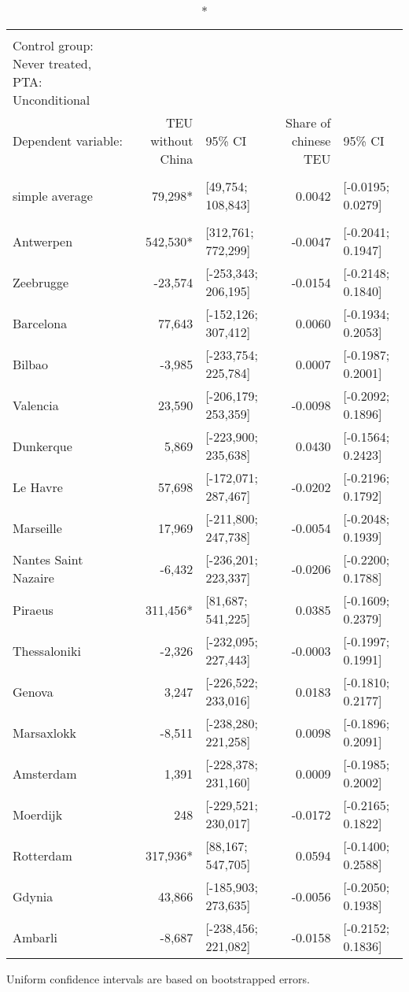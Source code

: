 \setlength{\LTpost}{0mm}
\begin{longtable}{l|rlrl}
\caption*{
{\large Aggregated average treatment effects on container throughput from different origins} \\ 
{\small Control group: Never treated, PTA: Unconditional}
} \\ 
\toprule
\multicolumn{1}{l}{Dependent variable:} & TEU without China & 95\% CI & Share of chinese TEU & 95\% CI \\ 
\midrule\addlinespace[2.5pt]
\multicolumn{5}{l}{\vspace*{-5mm}} \\ 
\midrule\addlinespace[2.5pt]
simple average &  79,298* & [49,754; 108,843] &  0.0042 & [-0.0195; 0.0279] \\ 
\midrule\addlinespace[2.5pt]
\multicolumn{5}{l}{by group:} \\ 
\midrule\addlinespace[2.5pt]
Antwerpen & 542,530* & [312,761; 772,299] & -0.0047 & [-0.2041; 0.1947] \\ 
Zeebrugge & -23,574 & [-253,343; 206,195] & -0.0154 & [-0.2148; 0.1840] \\ 
Barcelona &  77,643 & [-152,126; 307,412] &  0.0060 & [-0.1934; 0.2053] \\ 
Bilbao &  -3,985 & [-233,754; 225,784] &  0.0007 & [-0.1987; 0.2001] \\ 
Valencia &  23,590 & [-206,179; 253,359] & -0.0098 & [-0.2092; 0.1896] \\ 
Dunkerque &   5,869 & [-223,900; 235,638] &  0.0430 & [-0.1564; 0.2423] \\ 
Le Havre &  57,698 & [-172,071; 287,467] & -0.0202 & [-0.2196; 0.1792] \\ 
Marseille &  17,969 & [-211,800; 247,738] & -0.0054 & [-0.2048; 0.1939] \\ 
Nantes Saint Nazaire &  -6,432 & [-236,201; 223,337] & -0.0206 & [-0.2200; 0.1788] \\ 
Piraeus & 311,456* & [81,687; 541,225] &  0.0385 & [-0.1609; 0.2379] \\ 
Thessaloniki &  -2,326 & [-232,095; 227,443] & -0.0003 & [-0.1997; 0.1991] \\ 
Genova &   3,247 & [-226,522; 233,016] &  0.0183 & [-0.1810; 0.2177] \\ 
Marsaxlokk &  -8,511 & [-238,280; 221,258] &  0.0098 & [-0.1896; 0.2091] \\ 
Amsterdam &   1,391 & [-228,378; 231,160] &  0.0009 & [-0.1985; 0.2002] \\ 
Moerdijk &     248 & [-229,521; 230,017] & -0.0172 & [-0.2165; 0.1822] \\ 
Rotterdam & 317,936* & [88,167; 547,705] &  0.0594 & [-0.1400; 0.2588] \\ 
Gdynia &  43,866 & [-185,903; 273,635] & -0.0056 & [-0.2050; 0.1938] \\ 
Ambarli &  -8,687 & [-238,456; 221,082] & -0.0158 & [-0.2152; 0.1836] \\ 
\bottomrule
\end{longtable}
\begin{minipage}{\linewidth}
Uniform confidence intervals are based on bootstrapped errors.\\
\end{minipage}

